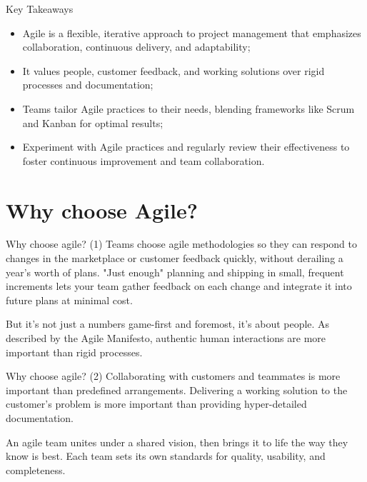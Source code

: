 \documentclass[
    notheorems,
    11pt,
    compress,
    aspectratio=169
]{beamer}
\begin{document}
\begin{frame}{Key Takeaways}
    \begin{itemize}
        \item Agile is a flexible, iterative approach to project management that emphasizes collaboration, continuous delivery, and adaptability;
        \pause
        \item It values people, customer feedback, and working solutions over rigid processes and documentation;
        \pause
        \item Teams tailor Agile practices to their needs, blending frameworks like Scrum and Kanban for optimal results;
        \pause
        \item Experiment with Agile practices and regularly review their effectiveness to foster continuous improvement and team collaboration.
    \end{itemize}
\end{frame}


\section{Why choose Agile?}

\begin{frame}{Why choose agile? (1)}
    Teams choose agile methodologies so they can respond to changes in the marketplace or customer feedback quickly, without derailing a year's worth of plans. "Just enough" planning and shipping in small, frequent increments lets your team gather feedback on each change and integrate it into future plans at minimal cost.

    \pause
    \vspace{0.5cm}

    But it's not just a numbers game-first and foremost, it's about people. As described by the Agile Manifesto, authentic human interactions are more important than rigid processes.
\end{frame}

\begin{frame}{Why choose agile? (2)}
    Collaborating with customers and teammates is more important than predefined arrangements. Delivering a working solution to the customer's problem is more important than providing hyper-detailed documentation.

    \pause
    \vspace{0.5cm}

    An agile team unites under a shared vision, then brings it to life the way they know is best. Each team sets its own standards for quality, usability, and completeness.
\end{frame}
\end{document}
